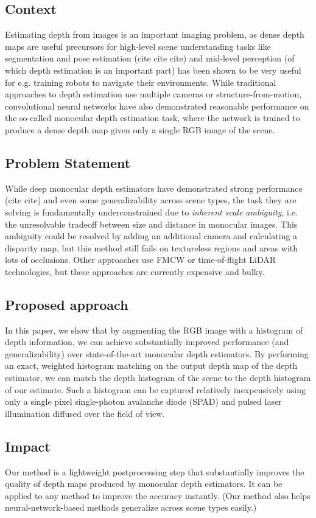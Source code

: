 %
\subsection{Context}
Estimating depth from images is an important imaging problem, as dense depth
maps are useful precursors for high-level scene understanding tasks like
segmentation and pose estimation (cite cite cite) and mid-level perception (of
which depth estimation is an important part) has been shown to be very useful
for e.g. training robots to navigate their environments. While traditional approaches to depth
estimation use multiple cameras or structure-from-motion, convolutional neural
networks have also demonstrated reasonable performance on the so-called
monocular depth estimation task, where the network is trained to produce a dense
depth map given only a single RGB image of the scene.
\subsection{Problem Statement}
While deep monocular depth estimators have demonstrated strong performance (cite
cite) and even some generalizability across scene types, the task they are solving is fundamentally
underconstrained due to \textit{inherent scale ambiguity}, i.e. the unresolvable
tradeoff between size and distance in monocular images. This ambiguity could be
resolved by adding an additional camera and calculating a disparity map, but
this method still fails on textureless regions and areas with lots of
occlusions. Other approaches use FMCW or time-of-flight LiDAR technologies,
but these approaches are currently expensive and bulky. 
\subsection{Proposed approach}
In this paper, we show that by augmenting the RGB image with a histogram of
depth information, we can achieve substantially improved performance
(and generalizability) over state-of-the-art monocular depth
estimators. By performing an exact, weighted histogram matching on the output
depth map of the depth estimator, we can match the depth histogram of the scene
to the depth histogram of our estimate. Such a histogram can be captured
relatively inexpensively using only a single pixel single-photon avalanche diode
(SPAD) and pulsed laser illumination diffused over the field of view.
\subsection{Impact}
Our method is a lightweight postprocessing step that substantially improves
the quality of depth maps produced by monocular depth estimators. It can be
applied to any method to improve the accuracy instantly. (Our method also
helps neural-network-based methods generalize across scene types easily.)
